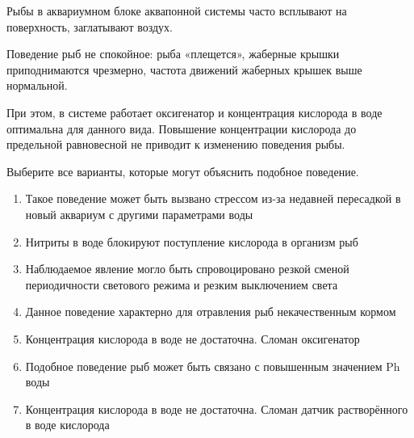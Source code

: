 
Рыбы в аквариумном блоке аквапонной системы часто всплывают на поверхность, заглатывают воздух.

Поведение рыб не спокойное: рыба «плещется», жаберные крышки приподнимаются чрезмерно, частота движений жаберных крышек выше нормальной.

При этом, в системе работает оксигенатор и концентрация кислорода в воде оптимальна для данного вида. Повышение концентрации кислорода до предельной равновесной не приводит к изменению поведения рыбы.

Выберите все варианты, которые могут объяснить подобное поведение.

\begin{enumerate}
    \item Такое поведение может быть вызвано стрессом из-за недавней пересадкой в новый аквариум с другими параметрами воды
    \item Нитриты в воде блокируют поступление кислорода в организм рыб
    \item Наблюдаемое явление могло быть спровоцировано резкой сменой периодичности светового режима и резким выключением света
    \item Данное поведение характерно для отравления рыб некачественным кормом
    \item Концентрация кислорода в воде не достаточна. Сломан оксигенатор
    \item Подобное поведение рыб может быть связано с повышенным значением Ph воды
    \item Концентрация кислорода в воде не достаточна. Сломан датчик растворённого в воде кислорода
\end{enumerate}